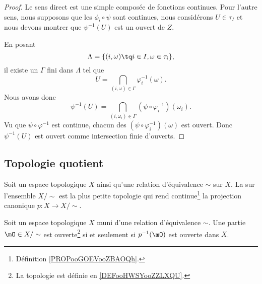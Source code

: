\begin{proof}
	Le sens direct est une simple composée de fonctions continues. Pour l'autre sens, nous supposons que les \( \phi_i\circ\psi\) sont continues, nous considérons \( U\in \tau_I\) et nous devons montrer que \( \psi^{-1}(U)\) est un ouvert de \( Z\).

	En posant
	\begin{equation}
		\Lambda=\{ (i,\omega)\tq i\in I,\omega\in \tau_i \},
	\end{equation}
	il existe un \( \Gamma\) fini dans \( \Lambda\) tel que
	\begin{equation}
		U=\bigcap_{(i,\omega)\in \Gamma}\varphi_i^{-1}(\omega).
	\end{equation}
	Nous avons donc
	\begin{equation}
		\psi^{-1}(U)=\bigcap_{(i,\omega_i)\in\Gamma}(\psi\circ\varphi_i^{-1})(\omega_i).
	\end{equation}
	Vu que \( \psi\circ\varphi^{-1}\) est continue, chacun des \( (\psi\circ\varphi_i^{-1})(\omega)\) est ouvert. Donc \( \psi^{-1}(U)\) est ouvert comme intersection finie d'ouverts.
\end{proof}


\subsection{Topologie quotient}

\begin{definition}        \label{DEFooHWSYooZZLXQU}
	Soit un espace topologique \( X\) ainsi qu'une relation d'équivalence \( \sim\) sur \( X\). La  sur l'ensemble \( X/\sim\) est la plus petite topologie qui rend continue\footnote{Définition \ref{PROPooGOEVooZBAOQh}.} la projection canonique \( p\colon X\to X/\sim\).
\end{definition}

\begin{proposition}     \label{PROPooDRPLooONCwYs}
	Soit un espace topologique \( X\) muni d'une relation d'équivalence \( \sim\). Une partie \( \mO\in X/\sim\) est ouverte\footnote{La topologie est définie en \ref{DEFooHWSYooZZLXQU}.} si et seulement si \( p^{-1}(\mO)\) est ouverte dans \( X\).
\end{proposition}

